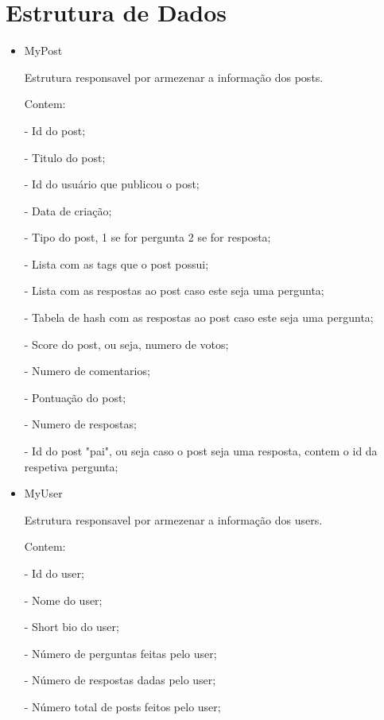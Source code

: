 \documentclass[a4paper,10pt]{article}
\begin{document}
\section{Estrutura de Dados}
  \begin{itemize}
  \item MyPost
  
  \quad Estrutura responsavel por armezenar a informa\c{c}\~{a}o dos posts.
  
  \quad Contem: 
    
    \quad \quad - Id do post;
    
    \quad \quad - Titulo do post;
    
    \quad \quad - Id do usu\'{a}rio que publicou o post;
    
    \quad \quad - Data de cria\c{c}\~{a}o;

    \quad \quad - Tipo do post, 1 se for pergunta 2 se for resposta;
  
    \quad \quad - Lista com as tags que o post possui;

    \quad \quad - Lista com as respostas ao post caso este seja uma pergunta;

    \quad \quad - Tabela de hash com as respostas ao post caso este seja uma pergunta;

    \quad \quad - Score do post, ou seja, numero de votos;

    \quad \quad - Numero de comentarios;

    \quad \quad - Pontua\c{c}\~{a}o do post;

    \quad \quad - Numero de respostas;

    \quad \quad - Id do post "pai", ou seja caso o post seja uma resposta, contem o id da respetiva pergunta;

    \item MyUser
  
  \quad Estrutura responsavel por armezenar a informa\c{c}\~{a}o dos users.
  
  \quad Contem: 
    
    \quad \quad - Id do user;
    
    \quad \quad - Nome do user;
    
    \quad \quad - Short bio do user;
    
    \quad \quad - N\'{u}mero de perguntas feitas pelo user;

    \quad \quad - N\'{u}mero de respostas dadas pelo user;
  
    \quad \quad - N\'{u}mero total de posts feitos pelo user;


\end{itemize}
\end{document}
